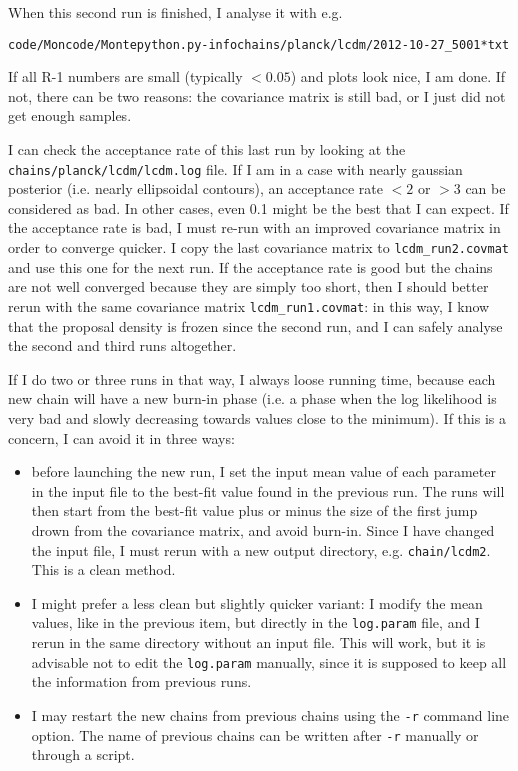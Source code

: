 \documentclass[10pt]{article}
\begin{document}
When this second run is finished, I analyse it with e.g.
\begin{alltt}
code/Moncode/Montepython.py -info chains/planck/lcdm/2012-10-27_5001*txt 
\end{alltt}
If all R-1 numbers are small (typically $<0.05$) and plots look nice, I am done. If not, there can be two reasons: the covariance matrix is still bad, or I just did not get enough samples.

I can check the acceptance rate of this last run by looking at the \verb?chains/planck/lcdm/lcdm.log? file. If I am in a case with nearly gaussian posterior (i.e. nearly ellipsoidal contours), an acceptance rate $<2$ or $>3$ can be considered as bad. In other cases, even 0.1 might be the best that I can expect. If the acceptance rate is bad, I must re-run with an improved covariance matrix in order to converge quicker. I copy the last covariance matrix to \verb?lcdm_run2.covmat? and use this one for the next run. If the acceptance rate is good but the chains are not well converged because they are simply too short, then I should better rerun with the same covariance matrix \verb?lcdm_run1.covmat?: in this way, I know that the proposal density is frozen since the second run, and I can safely analyse the second and third runs altogether.

If I do two or three runs in that way, I always loose running time, because each new chain will have a new burn-in phase (i.e. a phase when the log likelihood is very bad and slowly decreasing towards values close to the minimum). If this is a concern, I can avoid it in three ways:
\begin{itemize}
\item before launching the new run, I set the input mean value of each parameter in the input file to the best-fit value found in the previous run. The runs will then start from the best-fit value plus or minus the size of the first jump drown from the covariance matrix, and avoid burn-in. Since I have changed the input file, I must rerun with a new output directory, e.g. \verb?chain/lcdm2?. This is a clean method.
\item I might prefer a less clean but slightly quicker variant: I modify the mean values, like in the previous item, but directly in the \verb?log.param? file, and I rerun in the same directory without an input file. This will work, but it is advisable not to edit the \verb?log.param? manually, since it is supposed to keep all the information from previous runs.
\item I may restart the new chains from previous chains using the \verb?-r? command line option. The name of previous chains can be written after \verb?-r? manually or through a script.
\end{itemize}
\end{document}
